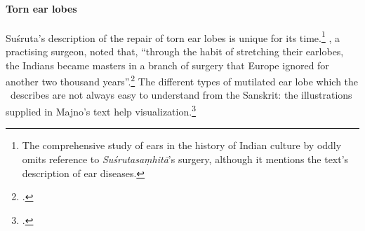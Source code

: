 %



\paragraph{Torn ear lobes}

Suśruta's description of the repair of torn ear lobes is  unique for
its time.\footnote{The comprehensive study of ears in the history of Indian culture 
by \citet{boll-2010} oddly omits reference to \emph{Suśrutasaṃhitā}'s surgery, 
although it mentions the text's description of ear diseases.}  
\citeauthor{majn-1975}, a practising surgeon, noted that, “through the habit of
stretching their earlobes, the Indians became masters in a branch of surgery
that Europe ignored for another two thousand years”.\footcite[291]{majn-1975}  
The different types of
mutilated ear lobe which the \SS\ describes are not always easy to understand
from the Sanskrit: the illustrations supplied in Majno's text help
visualization.\footcites[290--291]{majn-1975}[reproduced with permission 
in][92--93]{wuja-2003}

